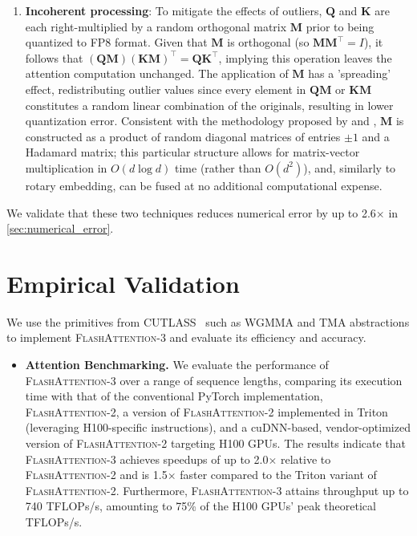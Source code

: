 \begin{algorithm}[H]
\begin{algorithmic}[1]
\begin{enumerate}
\item \textbf{Incoherent processing}: To mitigate the effects of outliers, $\mathbf{Q}$ and $\mathbf{K}$ are each right-multiplied by a random orthogonal matrix $\mathbf{M}$ prior to being quantized to FP8 format. Given that $\mathbf{M}$ is orthogonal (so $\mathbf{M}\mathbf{M}^\top = I$), it follows that $(\mathbf{Q}\mathbf{M})(\mathbf{K}\mathbf{M})^\top = \mathbf{Q}\mathbf{K}^\top$, implying this operation leaves the attention computation unchanged. The application of $\mathbf{M}$ has a 'spreading' effect, redistributing outlier values since every element in $\mathbf{Q}\mathbf{M}$ or $\mathbf{K}\mathbf{M}$ constitutes a random linear combination of the originals, resulting in lower quantization error. Consistent with the methodology proposed by \citet{chee2024quip} and \citet{tseng2024quip}, $\mathbf{M}$ is constructed as a product of random diagonal matrices of entries $\pm 1$ and a Hadamard matrix; this particular structure allows for matrix-vector multiplication in $O(d \log d)$ time (rather than $O(d^2)$), and, similarly to rotary embedding, can be fused at no additional computational expense.
\end{enumerate}

We validate that these two techniques reduces numerical error by up to 2.6$\times$ in \cref{sec:numerical_error}.

\section{Empirical Validation}
\label{sec:exp}

We use the primitives from CUTLASS~\citep{Thakkar_CUTLASS_2023} such as WGMMA and TMA abstractions to implement \textsc{FlashAttention-3} and evaluate its efficiency and accuracy.

\begin{itemize}

\item \textbf{Attention Benchmarking.} We evaluate the performance of \textsc{FlashAttention-3} over a range of sequence lengths, comparing its execution time with that of the conventional PyTorch implementation, \textsc{FlashAttention-2}, a version of \textsc{FlashAttention-2} implemented in Triton (leveraging H100-specific instructions), and a cuDNN-based, vendor-optimized version of \textsc{FlashAttention-2} targeting H100 GPUs. The results indicate that \textsc{FlashAttention-3} achieves speedups of up to 2.0$\times$ relative to \textsc{FlashAttention-2} and is 1.5$\times$ faster compared to the Triton variant of \textsc{FlashAttention-2}. Furthermore, \textsc{FlashAttention-3} attains throughput up to 740 TFLOPs/s, amounting to 75\% of the H100 GPUs’ peak theoretical TFLOPs/s.


\end{itemize}
\end{algorithmic}
\end{algorithm}
